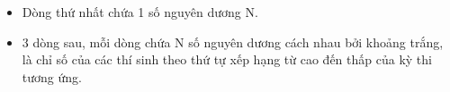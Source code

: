 \begin{itemize}
	\item     Dòng thứ nhất chứa 1 số nguyên dương N.   
	\item     3 dòng sau, mỗi dòng chứa N số nguyên dương cách nhau bởi khoảng trắng, là chỉ số của các thí sinh theo thứ tự xếp hạng từ cao đến thấp của kỳ   thi tương ứng.   
\end{itemize}